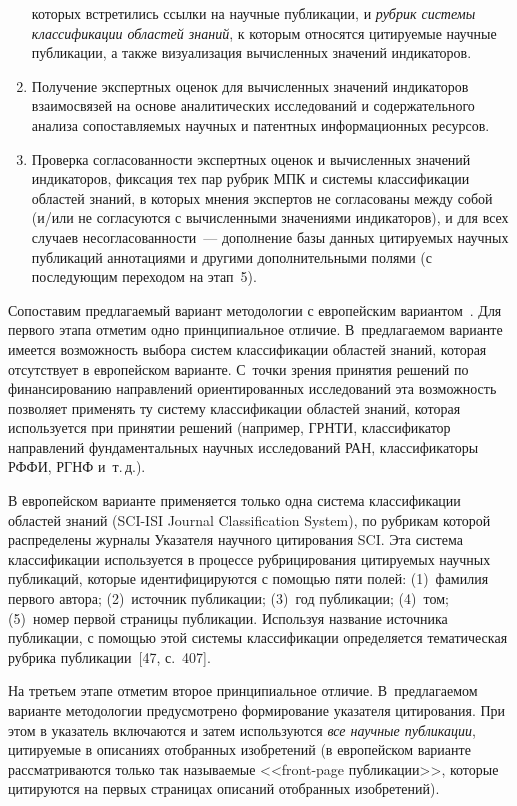 \begin{multicols}{2}
\begin{enumerate}[1.]
которых встретились ссылки на научные публикации, и \textit{рубрик сис\-те\-мы 
классификации областей знаний}, к которым относятся цитируемые научные 
публикации, а также визуализация вычисленных значений индикаторов.
\item Получение экспертных оценок для вычисленных значений индикаторов 
взаимосвязей на основе аналитических исследований и содержательного анализа 
сопоставляемых научных и патентных информационных ресурсов.
\item Проверка согласованности экспертных оценок и вычисленных значений 
индикаторов, фиксация тех пар рубрик МПК и системы классификации областей знаний, 
в которых мнения экспертов не согласованы между собой (и/или не согласуются с 
вычисленными значениями индикаторов), и для всех случаев несогласованности~--- 
дополнение базы данных цитируемых научных публикаций аннотациями и другими 
дополнительными полями (с последующим переходом на этап~5).
  \end{enumerate}
  
  Сопоставим предлагаемый вариант методологии с европейским вариантом~\cite{47-zat}. Для 
первого этапа отметим одно принципиальное отличие. В~предлагаемом варианте имеется 
возможность выбора систем классификации областей знаний, которая отсутствует в 
европейском варианте. С~точки зрения принятия решений по финансированию направлений 
ориентированных исследований эта возможность позволяет применять ту сис\-те\-му 
классификации областей знаний, которая используется при принятии решений (например, 
ГРНТИ, классификатор направлений фундаментальных научных исследований РАН, 
классификаторы РФФИ, РГНФ и~т.\,д.).
  
  В европейском варианте применяется только одна система классификации областей знаний 
(SCI-ISI Journal Classification System), по рубрикам которой распределены журналы Указателя 
научного цитирования SCI. Эта система классификации используется в процессе 
рубрицирования ци\-ти\-ру\-емых научных пуб\-ли\-ка\-ций, которые идентифицируются с 
помощью пяти полей: (1)~фамилия первого автора; (2)~источник публикации; (3)~год 
публикации; (4)~том; (5)~номер первой страницы публикации. Используя название источника 
пуб\-ли\-ка\-ции, с помощью этой системы классификации определяется тематическая рубрика 
  пуб\-ли\-ка\-ции~[47, с.~407].
  
  На третьем этапе отметим второе принципиальное отличие. В~предлагаемом варианте 
методологии предусмотрено формирование указателя цитирования. При этом в указатель 
включаются и затем используются \textit{все научные пуб\-ли\-ка\-ции}, цитируемые в 
описаниях отобранных изобретений (в европейском варианте рассматриваются только так 
называемые <<front-page пуб\-ли\-ка\-ции>>, которые цитируются на первых страницах 
описаний отобранных изобретений).
  

\end{multicols}
